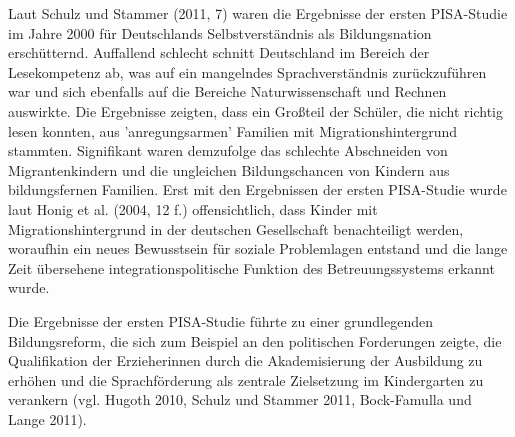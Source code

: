 Laut Schulz und Stammer (2011, 7) waren die Ergebnisse der ersten PISA-Studie im Jahre 2000 für Deutschlands Selbstverständnis als Bildungsnation erschütternd. Auffallend schlecht schnitt Deutschland  im Bereich der Lesekompetenz ab, was auf ein mangelndes Sprachverständnis zurückzuführen war und sich ebenfalls auf die Bereiche Naturwissenschaft und Rechnen auswirkte. Die Ergebnisse zeigten, dass ein Großteil der Schüler, die nicht richtig lesen konnten, aus 'anregungsarmen' Familien mit Migrationshintergrund stammten. Signifikant waren demzufolge das schlechte Abschneiden von Migrantenkindern und die ungleichen Bildungschancen von Kindern aus bildungsfernen Familien. Erst mit den Ergebnissen der ersten PISA-Studie wurde laut Honig et al. (2004, 12 f.) offensichtlich, dass Kinder mit Migrationshintergrund in der deutschen Gesellschaft benachteiligt werden, woraufhin ein neues Bewusstsein für soziale Problemlagen entstand und die lange Zeit übersehene integrationspolitische Funktion des Betreuungssystems erkannt wurde. 

Die Ergebnisse der ersten PISA-Studie führte zu einer grundlegenden Bildungsreform, die sich zum Beispiel an den politischen Forderungen zeigte, die Qualifikation der Erzieherinnen durch die Akademisierung der Ausbildung zu erhöhen und die Sprachförderung als zentrale Zielsetzung im Kindergarten zu verankern (vgl. Hugoth 2010, Schulz und Stammer 2011, Bock-Famulla und Lange 2011).
 
